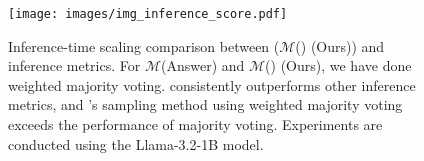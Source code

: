 \begin{figure}[t] 
    \centering
    \texttt{[image: images/img\_inference\_score.pdf]}
    \vspace{-0.12in}
    \caption{Inference-time scaling comparison between \sname ($\mathcal{M}$(\eos) (Ours)) and inference metrics. For $\mathcal{M}$(Answer) and $\mathcal{M}$(\eos) (Ours), we have done weighted majority voting. \sname consistently outperforms other inference metrics, and \sname's sampling method using weighted majority voting exceeds the performance of majority voting. Experiments are conducted using the Llama-3.2-1B model.}
    \label{figure:inference_score}
    \vspace{-0.13in}
\end{figure}